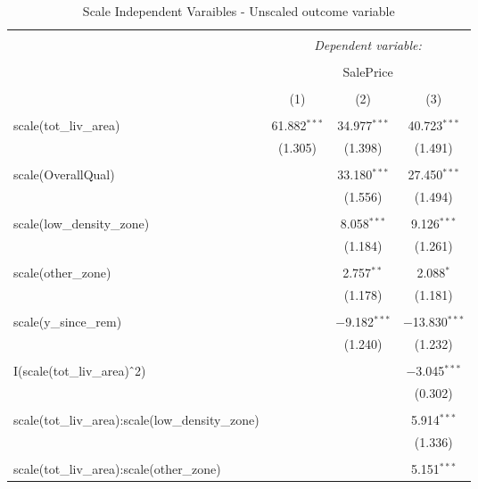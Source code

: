 \documentclass{article}
\begin{document}
\begin{table}[!htbp] \centering 
  \caption{Scale Independent Varaibles - Unscaled outcome variable} 
  \label{Scale Independent Varaibles - Unscaled outcome variable} 
\begin{tabular}{@{\extracolsep{5pt}}lccc} 
\\[-1.8ex]\hline 
\hline \\[-1.8ex] 
 & \multicolumn{3}{c}{\textit{Dependent variable:}} \\ 
\cline{2-4} 
\\[-1.8ex] & \multicolumn{3}{c}{SalePrice} \\ 
\\[-1.8ex] & (1) & (2) & (3)\\ 
\hline \\[-1.8ex] 
 scale(tot\_liv\_area) & 61.882$^{***}$ & 34.977$^{***}$ & 40.723$^{***}$ \\ 
  & (1.305) & (1.398) & (1.491) \\ 
  & & & \\ 
 scale(OverallQual) &  & 33.180$^{***}$ & 27.450$^{***}$ \\ 
  &  & (1.556) & (1.494) \\ 
  & & & \\ 
 scale(low\_density\_zone) &  & 8.058$^{***}$ & 9.126$^{***}$ \\ 
  &  & (1.184) & (1.261) \\ 
  & & & \\ 
 scale(other\_zone) &  & 2.757$^{**}$ & 2.088$^{*}$ \\ 
  &  & (1.178) & (1.181) \\ 
  & & & \\ 
 scale(y\_since\_rem) &  & $-$9.182$^{***}$ & $-$13.830$^{***}$ \\ 
  &  & (1.240) & (1.232) \\ 
  & & & \\ 
 I(scale(tot\_liv\_area)$\hat{\mkern6mu}$2) &  &  & $-$3.045$^{***}$ \\ 
  &  &  & (0.302) \\ 
  & & & \\ 
 scale(tot\_liv\_area):scale(low\_density\_zone) &  &  & 5.914$^{***}$ \\ 
  &  &  & (1.336) \\ 
  & & & \\ 
 scale(tot\_liv\_area):scale(other\_zone) &  &  & 5.151$^{***}$ \\ 

\end{tabular}
\end{table}
\end{document}
